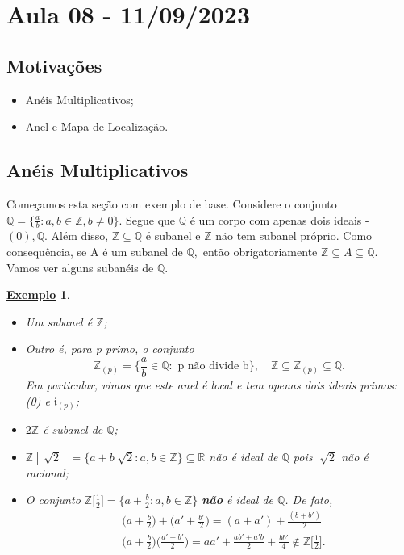 \documentclass{article}
\newtheorem{example}{\underline{Exemplo}}
\begin{document}
    \section{Aula 08 - 11/09/2023}
    \subsection{Motivações}
    \begin{itemize}
      \item Anéis Multiplicativos;
      \item Anel e Mapa de Localização.
    \end{itemize}
    \subsection{Anéis Multiplicativos}
    Começamos esta seção com exemplo de base. Considere o conjunto \(\mathbb{Q}=\biggl\{\frac{a}{b}: a, b\in \mathbb{Z}, b\neq 0\biggr\}.\)
    Segue que \(\mathbb{Q}\) é um corpo com apenas dois ideais - \((0), \mathbb{Q}.\) Além disso,
    \(\mathbb{Z}\subseteq \mathbb{Q}\) é subanel e \(\mathbb{Z}\) não tem subanel próprio. Como consequência, se
    A é um subanel de \(\mathbb{Q},\) então obrigatoriamente \(\mathbb{Z}\subseteq A\subseteq \mathbb{Q}\). Vamos ver alguns subanéis de \(\mathbb{Q}.\)
    \begin{example}
      \begin{itemize}
        \item[1)] Um subanel é \(\mathbb{Z}\);
        \item[2)] Outro é, para p primo, o conjunto 
          \[
            \mathbb{Z}_{(p)} = \biggl\{\frac{a}{b}\in \mathbb{Q}:\text{ p não divide b}\biggr\},\quad \mathbb{Z}\subseteq \mathbb{Z}_{(p)}\subseteq \mathbb{Q}.
          \]
          Em particular, vimos que este anel é local e tem apenas dois ideais primos: (0) e \(\mathfrak{i}_{(p)}\);
        \item[3)] \(2\mathbb{Z}\) é subanel de \(\mathbb{Q}\);
        \item[4)] \(\mathbb{Z}[\sqrt[]{2}]=\{a + b\sqrt[]{2}: a, b\in \mathbb{Z}\}\subseteq \mathbb{R}\) não é ideal de \(\mathbb{Q}\) pois \(\sqrt[]{2}\) não é racional;
        \item[5)] O conjunto \(\mathbb{Z}\biggl[\frac{1}{2}\biggr]=\biggl\{a + \frac{b}{2}: a, b\in \mathbb{Z}\biggr\}\) \textbf{não} é ideal de \(\mathbb{Q}\). De fato,
          \begin{align*}
  &\biggl(a+\frac{b}{2}\biggr)+\biggl(a'+\frac{b'}{2}\biggr) = (a+a') + \frac{(b+b')}{2} \\
  &\biggl(a+\frac{b}{2}\biggr)\biggl(\frac{a'+b'}{2}\biggr) = aa' + \frac{ab'+a'b}{2} + \frac{bb'}{4}\not\in \mathbb{Z}\biggl[\frac{1}{2}\biggr].
          \end{align*}
      \end{itemize}
    \end{example}
\end{document}
